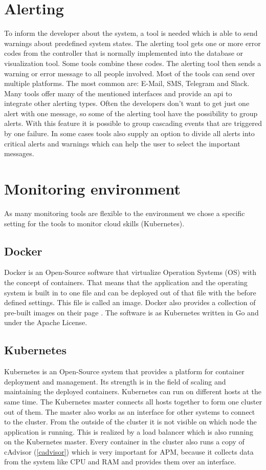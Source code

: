 \section{Alerting}
\label{alerting}
To inform the developer about the system, a tool is needed which is able to send warnings about predefined system states.
The alerting tool gets one or more error codes from the controller that is normally implemented into the database or visualization tool. Some tools combine these codes. The alerting tool then sends a warning or error message to all people involved. Most of the tools can send over multiple platforms. The most common are: E-Mail, SMS, Telegram and Slack. Many tools offer many of the mentioned interfaces and provide an api to integrate other alerting types.
Often the developers don’t want to get just one alert with one message, so some of the alerting tool have the possibility to group alerts. With this feature it is possible to group cascading events that are triggered by one failure. In some cases tools also supply an option to divide all alerts into critical alerts and warnings which can help the user to select the important messages.  

\section{Monitoring environment}
\label{monitoringenviroment}
As many monitoring tools are flexible to the environment we chose a specific setting for the tools to monitor cloud skills (Kubernetes). \cite{Vohra2016} 
\subsection{Docker}
Docker is an Open-Source software that virtualize Operation Systems (OS) with the concept of containers. That means that the application and the operating system is built in to one file and can be deployed out of that file with the before defined settings. This file is called an image. Docker also provides a collection of pre-built images on their page  \cite{Docker}. The software is as Kubernetes written in Go and under the Apache License.

\subsection{Kubernetes}
Kubernetes is an Open-Source system that provides a platform for container deployment and management. Its strength is in the field of scaling and maintaining the deployed containers. Kubernetes can run on different hosts at the same time. The Kubernetes master connects all hosts together to form one cluster out of them. The master also works as an interface for other systems to connect to the cluster. From the outside of the cluster it is not visible on which node the application is running. This is realized by a load balancer which is also running on the Kubernetes master. Every container in the cluster also runs a copy of cAdvisor (\ref{cadvisor}) which is very important for APM, because it collects data from the system like CPU and RAM and provides them over an interface.
